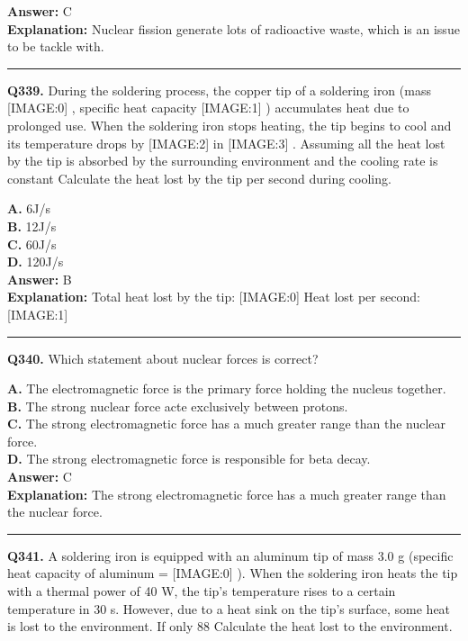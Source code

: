 \documentclass[12pt]{article}
\begin{document}
\textbf{Answer:} C \\
\textbf{Explanation:} Nuclear fission generate lots of radioactive waste, which is an issue to be tackle with.

\hrule
\vspace{1em}


\noindent
\textbf{Q339.} During the soldering process, the copper tip of a soldering iron (mass
[IMAGE:0]
, specific heat capacity
[IMAGE:1]
) accumulates heat due to prolonged use. When the soldering iron stops heating, the tip begins to cool and its temperature drops by
[IMAGE:2]
in
[IMAGE:3]
. Assuming all the heat lost by the tip is absorbed by the surrounding environment and the cooling rate is constant
Calculate the heat lost by the tip per second during cooling.



\textbf{A.} 6J/s \\
\textbf{B.} 12J/s \\
\textbf{C.} 60J/s \\
\textbf{D.} 120J/s \\

\textbf{Answer:} B \\
\textbf{Explanation:} Total heat lost by the tip:
[IMAGE:0]
Heat lost per second:
[IMAGE:1]

\hrule
\vspace{1em}


\noindent
\textbf{Q340.} Which statement about nuclear forces is correct?



\textbf{A.} The electromagnetic force is the primary force holding the nucleus together. \\
\textbf{B.} The strong nuclear force acte exclusively between protons. \\
\textbf{C.} The strong electromagnetic force has a much greater range than the nuclear force. \\
\textbf{D.} The strong electromagnetic force is responsible for beta decay. \\

\textbf{Answer:} C \\
\textbf{Explanation:} The strong electromagnetic force has a much greater range than the nuclear force.

\hrule
\vspace{1em}


\noindent
\textbf{Q341.} A soldering iron is equipped with an aluminum tip of mass 3.0 g (specific heat capacity of aluminum =
[IMAGE:0]
). When the soldering iron heats the tip with a thermal power of 40 W, the tip's temperature rises to a certain temperature in 30 s. However, due to a heat sink on the tip's surface, some heat is lost to the environment. If only 88%
Calculate the heat lost to the environment.
\end{document}
